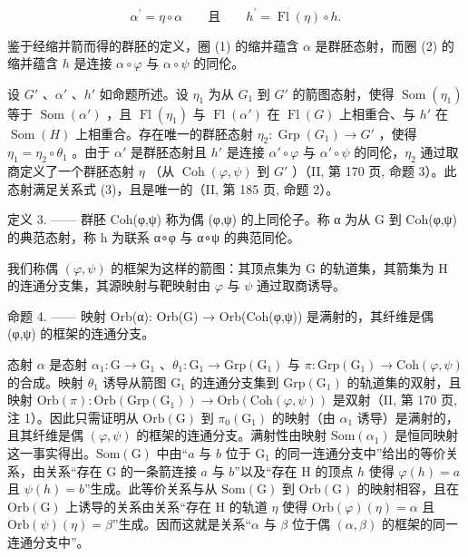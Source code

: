 \[
\alpha^ {\prime} = \eta \circ \alpha \qquad\text{且}\qquad h ^ {\prime} = \operatorname{Fl} (\eta) \circ h.\tag{3}
\]

鉴于经缩并箭而得的群胚的定义，圈 (1) 的缩并蕴含 \(\alpha\) 是群胚态射，而圈 (2) 的缩并蕴含 \(h\) 是连接 \(\alpha \circ \varphi\) 与 \(\alpha \circ \psi\) 的同伦。

设 \(G'\) 、\(\alpha'\) 、\(h'\) 如命题所述。设 \(\eta_{1}\) 为从 \(G_{1}\) 到 \(G'\) 的箭图态射，使得 \(\operatorname{Som}(\eta_{1})\) 等于 \(\operatorname{Som}(\alpha')\) ，且 \(\operatorname{Fl}(\eta_{1})\) 与 \(\operatorname{Fl}(\alpha')\) 在 \(\operatorname{Fl}(G)\) 上相重合、与 \(h'\) 在 \(\operatorname{Som}(H)\) 上相重合。存在唯一的群胚态射 \(\eta_{2}: \operatorname{Grp}(G_{1}) \to G'\) ，使得 \(\eta_{1} = \eta_{2} \circ \theta_{1}\) 。由于 \(\alpha'\) 是群胚态射且 \(h'\) 是连接 \(\alpha' \circ \varphi\) 与 \(\alpha' \circ \psi\) 的同伦，\(\eta_{2}\) 通过取商定义了一个群胚态射 \(\eta\) （从 \(\operatorname{Coh}(\varphi, \psi)\) 到 \(G'\) ）（II, 第 170 页, 命题 3）。此态射满足关系式 (3)，且是唯一的（II, 第 185 页, 命题 2）。

定义 3. —— 群胚 Coh(φ,ψ) 称为偶 (φ,ψ) 的上同伦子。称 α 为从 G 到 Coh(φ,ψ) 的典范态射，称 h 为联系 α∘φ 与 α∘ψ 的典范同伦。

我们称偶 \((\varphi,\psi)\) 的框架为这样的箭图：其顶点集为 G 的轨道集，其箭集为 H 的连通分支集，其源映射与靶映射由 \(\varphi\) 与 \(\psi\) 通过取商诱导。

命题 4. —— 映射 Orb(α): Orb(G) → Orb(Coh(φ,ψ)) 是满射的，其纤维是偶 (φ,ψ) 的框架的连通分支。

态射 \(\alpha\) 是态射 \(\alpha_{1}\colon\mathrm{G}\to\mathrm{G}_{1}\) 、\(\theta_{1}\colon\mathrm{G}_{1}\to\mathrm{Grp}(\mathrm{G}_{1})\) 与 \(\pi\colon\mathrm{Grp}(\mathrm{G}_{1})\to\mathrm{Coh}(\varphi,\psi)\) 的合成。映射 \(\theta_{1}\) 诱导从箭图 \(\mathrm{G}_{1}\) 的连通分支集到 \(\mathrm{Grp}(\mathrm{G}_{1})\) 的轨道集的双射，且映射 \(\mathrm{Orb}(\pi)\colon\mathrm{Orb}(\mathrm{Grp}(\mathrm{G}_{1}))\to\mathrm{Orb}(\mathrm{Coh}(\varphi,\psi))\) 是双射（II, 第 170 页, 注 1）。因此只需证明从 \(\mathrm{Orb}(\mathrm{G})\) 到 \(\pi_{0}(\mathrm{G}_{1})\) 的映射（由 \(\alpha_{1}\) 诱导）是满射的，且其纤维是偶 \((\varphi,\psi)\) 的框架的连通分支。满射性由映射 \(\mathrm{Som}(\alpha_{1})\) 是恒同映射这一事实得出。\(\mathrm{Som}(\mathrm{G})\) 中由“\(a\) 与 \(b\) 位于 \(\mathrm{G}_{1}\) 的同一连通分支中”给出的等价关系，由关系“存在 G 的一条箭连接 \(a\) 与 \(b\)”以及“存在 H 的顶点 \(h\) 使得 \(\varphi(h)=a\) 且 \(\psi(h)=b\)”生成。此等价关系与从 \(\mathrm{Som}(\mathrm{G})\) 到 \(\mathrm{Orb}(\mathrm{G})\) 的映射相容，且在 \(\mathrm{Orb}(\mathrm{G})\) 上诱导的关系由关系“存在 H 的轨道 \(\eta\) 使得 \(\mathrm{Orb}(\varphi)(\eta)=\alpha\) 且 \(\mathrm{Orb}(\psi)(\eta)=\beta\)”生成。因而这就是关系“\(\alpha\) 与 \(\beta\) 位于偶 \((\alpha,\beta)\) 的框架的同一连通分支中”。

